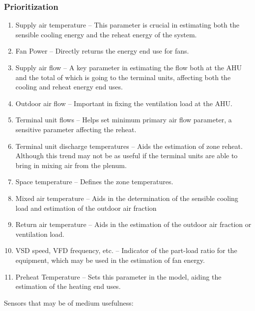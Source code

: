\subsubsection{Prioritization}
\begin{enumerate}
\item Supply air temperature -- This parameter is crucial in estimating both the sensible cooling energy and the reheat energy of the system. 
\item Fan Power -- Directly returns the energy end use for fans.
\item Supply air flow -- A key parameter in estimating the flow both at the AHU and the total of which is going to the terminal units, affecting both the cooling and reheat energy end uses.
\item Outdoor air flow -- Important in fixing the ventilation load at the AHU.
\item Terminal unit flows -- Helps set minimum primary air flow parameter, a sensitive parameter affecting the reheat. 
\item Terminal unit discharge temperatures -- Aids the estimation of zone reheat. Although this trend may not be as useful if the terminal units are able to bring in mixing air from the plenum. 
\item Space temperature -- Defines the zone temperatures. 
\item Mixed air temperature -- Aids in the determination of the sensible cooling load and estimation of the outdoor air fraction
\item Return air temperature -- Aids in the estimation of the outdoor air fraction or ventilation load.
\item VSD speed, VFD frequency, etc. -- Indicator of the part-load ratio for the equipment, which may be used in the estimation of fan energy. 
\item Preheat Temperature -- Sets this parameter in the model, aiding the estimation of the heating end uses.
\end{enumerate}

Sensors that may be of medium usefulness:

